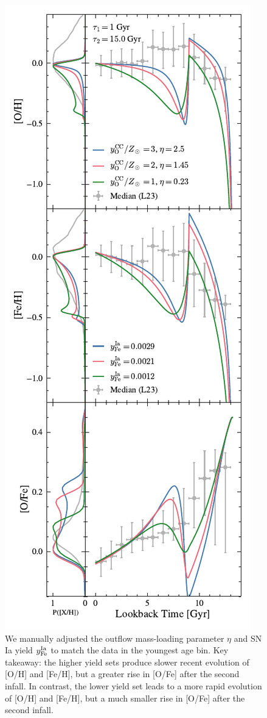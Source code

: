 \documentclass[twocolumn,twocolappendix,linenumbers]{aastex631}
\begin{document}
\begin{figure}
    \centering
    \includegraphics{figures/yield_outflow.pdf}
    \caption{We manually adjusted the outflow mass-loading parameter $\eta$ and SN Ia yield $y ^{\rm Ia}_{\rm Fe}$ to match the data in the youngest age bin. Key takeaway: the higher yield sets produce slower recent evolution of [O/H] and [Fe/H], but a greater rise in [O/Fe] after the second infall. In contrast, the lower yield set leads to a more rapid evolution of [O/H] and [Fe/H], but a much smaller rise in [O/Fe] after the second infall.}
    \label{fig:onezone-dtd}
\end{figure}
\end{document}
